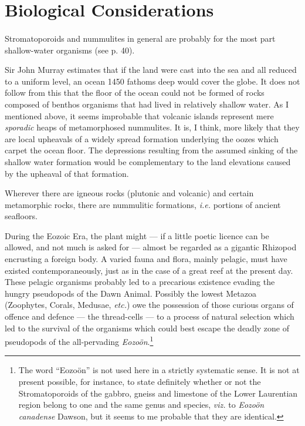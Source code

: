 \documentclass[a4paper, 12pt, oneside]{article}
\begin{document}
\section{Biological Considerations}
\paragraph{}
Stromatoporoids and nummulites in general are probably for the most part shallow-water organisms (see p. 40).

Sir John Murray estimates that if the land were cast into the sea and all reduced to a uniform level, an ocean 1450 fathoms deep would cover the globe. It does not follow from this that the floor of the ocean could not be formed of rocks composed of benthos organisms that had lived in relatively shallow water. As I mentioned above, it seems improbable that volcanic islands represent mere \emph{sporadic} heaps of metamorphosed nummulites. It is, I think, more likely that they are local upheavals of a widely spread formation underlying the oozes which carpet the ocean floor. The depressions resulting from the assumed sinking of the shallow water formation would be complementary to the land elevations caused by the upheaval of that formation.

Wherever there are igneous rocks (plutonic and volcanic) and certain metamorphic rocks, there are nummulitic formations, \emph{i.e.} portions of ancient seafloors.

During the Eozoic Era, the plant might --- if a little poetic licence can be allowed, and not much is asked for --- almost be regarded as a gigantic Rhizopod encrusting a foreign body. A varied fauna and flora, mainly pelagic, must have existed contemporaneously, just as in the case of a great reef at the present day. These pelagic organisms probably led to a precarious existence evading the hungry pseudopods of the Dawn Animal. Possibly the lowest Metazoa (Zoophytes, Corals, Medusae, \emph{etc.}) owe the possession of those curious organs of offence and defence --- the thread-cells --- to a process of natural selection which led to the survival of the organisms which could best escape the deadly zone of pseudopods of the all-pervading \emph{Eozoön}.\footnote{The word ``Eozoön'' is not used here in a strictly systematic sense. It is not at present possible, for instance, to state definitely whether or not the Stromatoporoids of the gabbro, gneiss and limestone of the Lower Laurentian region belong to one and the same genus and species, \emph{viz.} to \emph{Eozoön canadense} Dawson, but it seems to me probable that they are identical.}
\end{document}
